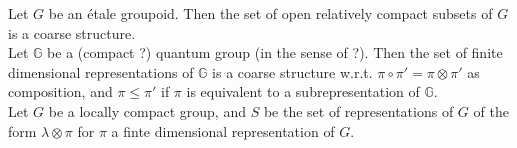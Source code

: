 Let $G$ be an étale groupoid. Then the set of open relatively compact subsets of $G$ is a coarse structure. \\

Let $\mathbb G$ be a (compact ?) quantum group (in the sense of ?). Then the set of finite dimensional representations of $\mathbb G$ is a coarse structure w.r.t. $\pi\circ \pi'=\pi\otimes \pi'$ as composition, and $\pi\leq\pi'$ if $\pi$ is equivalent to a subrepresentation of $\mathbb G$.\\

Let $G$ be a locally compact group, and $S$ be the set of representations of $G$ of the form $\lambda\otimes\pi$ for $\pi$ a finte dimensional representation of $G$.   


































